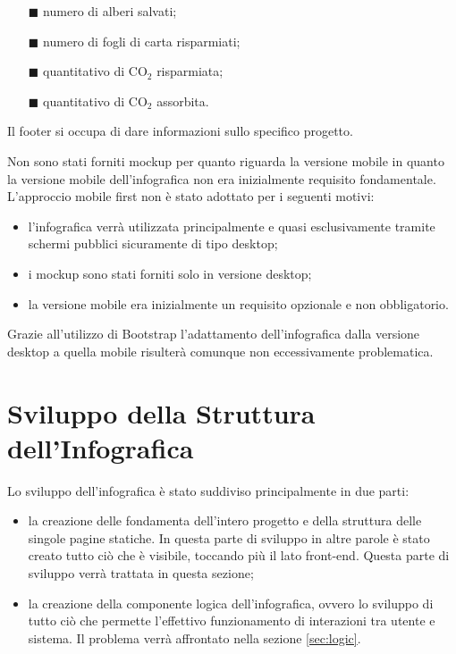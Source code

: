 \begin{itemize}
\begin{itemize}
    \item[$\blacksquare$] numero di alberi salvati;
    \item[$\blacksquare$] numero di fogli di carta risparmiati;
    \item[$\blacksquare$] quantitativo di CO$_2$ risparmiata;
    \item[$\blacksquare$] quantitativo di CO$_2$ assorbita.
\end{itemize}
Il footer si occupa di dare informazioni sullo specifico progetto.\newline\newline
\end{itemize}

\noindent Non sono stati forniti mockup per quanto riguarda la versione mobile in quanto la versione mobile dell'infografica non era inizialmente requisito fondamentale.
L'approccio mobile first non è stato adottato per i seguenti motivi:
\begin{itemize}
    \item l'infografica verrà utilizzata principalmente e quasi esclusivamente tramite schermi pubblici sicuramente di tipo desktop;
    \item i mockup sono stati forniti solo in versione desktop;
    \item la versione mobile era inizialmente un requisito opzionale e non obbligatorio.
\end{itemize}
Grazie all'utilizzo di Bootstrap l'adattamento dell'infografica dalla versione desktop a quella mobile risulterà comunque non eccessivamente problematica.

\section{Sviluppo della Struttura dell'Infografica}
\label{sec:svil}
\noindent Lo sviluppo dell'infografica è stato suddiviso principalmente in due parti:
\begin{itemize}
    \item la creazione delle fondamenta dell'intero progetto e della struttura delle singole pagine statiche. In questa parte di sviluppo in altre parole è stato creato tutto ciò che è visibile, toccando più il lato front-end. Questa parte di sviluppo verrà trattata in questa sezione;
    \item la creazione della componente logica dell'infografica, ovvero lo sviluppo di tutto ciò che permette l'effettivo funzionamento di interazioni tra utente e sistema. Il problema verrà affrontato nella sezione \ref{sec:logic}.
\end{itemize}
